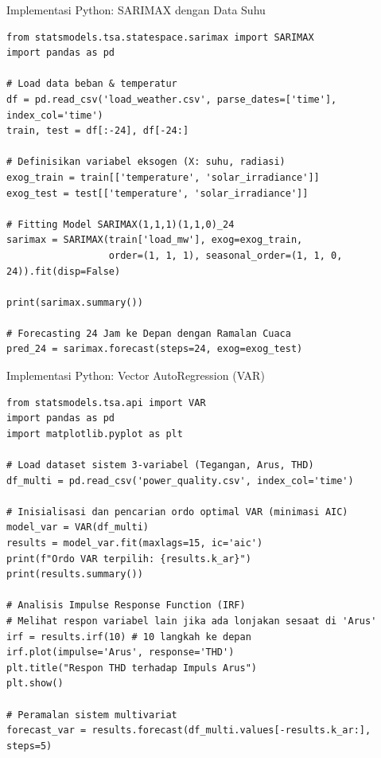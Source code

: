 \documentclass[aspectratio=169, 10pt]{beamer}
\begin{document}
\begin{frame}[fragile]{Implementasi Python: SARIMAX dengan Data Suhu}
\begin{lstlisting}
from statsmodels.tsa.statespace.sarimax import SARIMAX
import pandas as pd

# Load data beban & temperatur
df = pd.read_csv('load_weather.csv', parse_dates=['time'], index_col='time')
train, test = df[:-24], df[-24:]

# Definisikan variabel eksogen (X: suhu, radiasi)
exog_train = train[['temperature', 'solar_irradiance']]
exog_test = test[['temperature', 'solar_irradiance']]

# Fitting Model SARIMAX(1,1,1)(1,1,0)_24
sarimax = SARIMAX(train['load_mw'], exog=exog_train,
                  order=(1, 1, 1), seasonal_order=(1, 1, 0, 24)).fit(disp=False)

print(sarimax.summary())

# Forecasting 24 Jam ke Depan dengan Ramalan Cuaca
pred_24 = sarimax.forecast(steps=24, exog=exog_test)
\end{lstlisting}
\end{frame}

\begin{frame}[fragile]{Implementasi Python: Vector AutoRegression (VAR)}
\begin{lstlisting}
from statsmodels.tsa.api import VAR
import pandas as pd
import matplotlib.pyplot as plt

# Load dataset sistem 3-variabel (Tegangan, Arus, THD)
df_multi = pd.read_csv('power_quality.csv', index_col='time')

# Inisialisasi dan pencarian ordo optimal VAR (minimasi AIC)
model_var = VAR(df_multi)
results = model_var.fit(maxlags=15, ic='aic')
print(f"Ordo VAR terpilih: {results.k_ar}")
print(results.summary())

# Analisis Impulse Response Function (IRF)
# Melihat respon variabel lain jika ada lonjakan sesaat di 'Arus'
irf = results.irf(10) # 10 langkah ke depan
irf.plot(impulse='Arus', response='THD')
plt.title("Respon THD terhadap Impuls Arus")
plt.show()

# Peramalan sistem multivariat
forecast_var = results.forecast(df_multi.values[-results.k_ar:], steps=5)
\end{lstlisting}
\end{frame}
\end{document}
